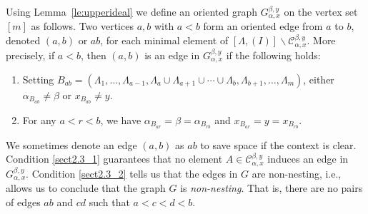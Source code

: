 \documentclass[ALCO,ThmDefs,Unicode,epreuves]{cedram}
\begin{document}
Using Lemma~\ref{le:upperideal} we define an oriented graph $G_{\alpha,x}^{\beta,y}$ on the vertex set $[m]$ as follows. Two vertices $a,b$ with $a<b$ form an oriented edge from $a$ to $b$, denoted $(a,b)$ or $ab$, for each minimal element of $[\Lambda,(I)]\backslash \mathcal{C}_{\alpha,x}^{\beta,y}$. 
More precisely, if $a<b$, then $(a,b)$ is an edge in $ G_{\alpha,x}^{\beta,y}$ if the following holds:
\begin{enumerate}
 \item %
\label{sect2.3_1} Setting $B_{ab}=(\Lambda_1,\ldots,\Lambda_{a-1},\Lambda_a\cup\Lambda_{a+1}\cup {}\cdots{}\cup \Lambda_b,\Lambda_{b+1},\ldots,\Lambda_m)$, either
 $ \alpha_{B_{ab}}\ne \beta$ or $x_{B_{ab}}\ne y.$
 \item %
\label{sect2.3_2}For any $a<r<b$, we have $ \alpha_{B_{ar}}= \beta=\alpha_{B_{rb}}$ and $x_{B_{ar}}= y=x_{B_{rb}}.$
\end{enumerate}
We sometimes denote an edge $(a,b)$ as $ab$ to save space if the context is clear.
Condition \eqref{sect2.3_1} guarantees that no element $A\in\mathcal{C}_{\alpha,x}^{\beta,y}$ induces an edge in $G_{\alpha,x}^{\beta,y}$. Condition \eqref{sect2.3_2} tells us that the edges in $G$ are non-nesting, i.e., 
allows us to conclude that the graph $G$ is \emph{non-nesting}. That is, there are no pairs of edges $ab$ and $cd$ such that $a<c<d< b$. 
\end{document}
